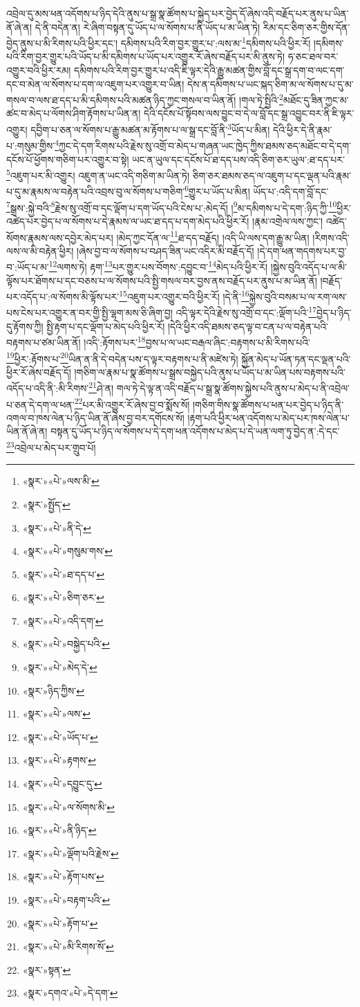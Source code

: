 འབྲེལ་དུ་མས་ཕན་འདོགས་པ་ཉིད་དེའི་ནུས་པ་སྒྲ་སྣ་ཚོགས་པ་སྐྱེད་པར་བྱེད་དོ་ཞེས་འདི་བརྗོད་པར་ནུས་པ་ཡིན་ནོ་ཞེ་ན། དེ་ནི་བདེན་ན། རེ་ཞིག་བསྟན་དུ་ཡོད་པ་ལ་སོགས་པ་ནི་ཡོད་པ་མ་ཡིན་ཏེ། རིམ་དང་ཅིག་ཅར་གྱིས་དོན་བྱེད་ནུས་པ་མི་རིགས་པའི་ཕྱིར་དང་། དམིགས་པའི་རིག་བྱར་གྱུར་པ་:ལས་མ་\footnote{«སྣར་»«པེ་»ལས་མི་}དམིགས་པའི་ཕྱིར་རོ། །དམིགས་པའི་རིག་བྱར་གྱུར་པའི་ཡོད་པ་མི་དམིགས་པ་ཡོད་པར་འགྱུར་རོ་ཞེས་བརྗོད་པར་མི་ནུས་ཏེ། ཧ་ཅང་ཐལ་བར་འགྱུར་བའི་ཕྱིར་རམ། དམིགས་པའི་རིག་བྱར་གྱུར་པ་འདི་ཇི་ལྟར་དེའི་རྒྱུ་མཚན་གྱིས་བློ་དང་སྒྲ་དག་བ་ལང་དག་དང་བ་མེན་ལ་སོགས་པ་དག་ལ་འཇུག་པར་འགྱུར་བ་ཡིན། དེས་ན་དམིགས་པ་ཡང་སྐད་ཅིག་མ་ལ་སོགས་པ་དུ་མ་གསལ་བ་ལས་ཐ་དད་པ་མི་དམིགས་པའི་མཚན་ཉིད་ཀྱང་གསལ་བ་ཡིན་ནོ། །གལ་ཏེ་སྤྱིའི་\footnote{«སྣར་»སྤྱོད་}མཐོང་དུ་ཟིན་ཀྱང་མ་ཚང་བ་མེད་པ་ལོགས་ཤིག་རྟོགས་པ་ཡིན་ན། དེའི་དངོས་པོ་སྟོབས་ལས་བྱུང་བ་དེ་ལ་བློ་དང་སྒྲ་འབྱུང་བར་ནི་ཇི་ལྟར་འགྱུར། དབྱིག་པ་ཅན་ལ་སོགས་པ་རྒྱུ་མཚན་མ་རྟོགས་པ་ལ་སྒྲ་དང་བློ་ནི་\footnote{«སྣར་»«པེ་»ནི་དེ་}ཡོད་པ་མིན། དེའི་ཕྱིར་དེ་ནི་རྣམ་པ་:གསུམ་གྱིས་\footnote{«སྣར་»«པེ་»གསུམ་གས་}ཀྱང་དེ་དག་རིགས་པའི་རྗེས་སུ་འགྲོ་བ་མེད་པ་གཞན་ཡང་ཁྱེད་ཀྱིས་ཐམས་ཅད་མཐོང་བ་དེ་དག་དངོས་པོ་ཕྱོགས་གཅིག་པར་འགྱུར་བ་སྟེ། ཡང་ན་ཡུལ་དང་དངོས་པོ་ཐ་དད་པས་འདི་ཅིག་ཅར་ཡུལ་:ཐ་དད་པར་\footnote{«སྣར་»«པེ་»ཐ་དད་པ་}འཇུག་པར་མི་འགྱུར། འཇུག་ན་ཡང་འདི་གཅིག་མ་ཡིན་ཏེ། ཅིག་ཅར་ཐམས་ཅད་ལ་འཇུག་པ་དང་ལྡན་པའི་རྣམ་པ་དུ་མ་རྣམས་ལ་བརྟེན་པའི་འབྲས་བུ་ལ་སོགས་པ་གཅིག་\footnote{«སྣར་»«པེ་»ཅིག་ཅར་}གྱུར་པ་ཡོད་པ་མིན། ཡོད་པ་:འདི་དག་བློ་དང་\footnote{«སྣར་»«པེ་»འདི་དག་}སྒྲས་:སྐྱེ་བའི་\footnote{«སྣར་»«པེ་»བསྐྱེད་པའི་}རྗེས་སུ་འགྲོ་བ་དང་ལྡོག་པ་དག་ཡོད་པའི་ངེས་པ་:མེད་དོ། །\footnote{«སྣར་»«པེ་»མེད་དེ་}མ་དམིགས་པ་དེ་དག་:ཉིད་ཀྱི་\footnote{«སྣར་»ཉིད་ཀྱིས་}ཕྱིར་འཚེད་པར་བྱེད་པ་ལ་སོགས་པ་དེ་རྣམས་ལ་ཡང་ཐ་དད་པ་དག་མེད་པའི་ཕྱིར་རོ། །རྣམ་འགྲེལ་ལས་ཀྱང་། འཚེད་སོགས་རྣམས་ལས་དབྱེར་མེད་པར། །མེད་ཀྱང་དོན་ལ་\footnote{«སྣར་»«པེ་»ལས་}ཐ་དད་བརྗོད། །འདི་ཡི་ལས་དག་རྒྱུ་མ་ཡིན། །རིགས་འདི་ལས་ལ་མི་བརྟེན་ཕྱིར། །ཞེས་བྱ་བ་ལ་སོགས་པ་བཤད་ཟིན་ཡང་འདིར་མི་བརྗོད་དོ། །དེ་དག་ཕན་གདགས་པར་བྱ་བ་:ཡོད་པ་མ་\footnote{«སྣར་»«པེ་»ཡོད་པ་}ལགས་ཏེ། རྟག་\footnote{«སྣར་»«པེ་»རྟགས་}པར་གྱུར་པས་བོགས་:དབྱུང་བ་\footnote{«སྣར་»«པེ་»དབྱུང་དུ་}མེད་པའི་ཕྱིར་རོ། །སྐྱེས་བུའི་འདོད་པ་ལ་མི་ལྟོས་པར་ཐོགས་པ་དང་བཅས་པ་ལ་སོགས་པའི་སྤྱི་གསལ་བར་བྱས་ནས་བརྗོད་པར་ནུས་པ་མ་ཡིན་ནོ། །བརྗོད་པར་འདོད་པ་:ལ་སོགས་མི་ལྟོས་པར་\footnote{«སྣར་»«པེ་»ལ་སོགས་མི་}འཇུག་པར་འགྱུར་བའི་ཕྱིར་རོ། །དེ་ནི་\footnote{«སྣར་»«པེ་»ནི་ཉིད་}སྐྱེས་བུའི་བསམ་པ་ལ་རག་ལས་པས་ངེས་པར་འགྱུར་ན་བར་གྱི་སྤྱི་ལྷག་མས་ཅི་ཞིག་བྱ། འདི་ལྟར་དེའི་རྗེས་སུ་འགྲོ་བ་དང་:ལྡོག་པའི་\footnote{«སྣར་»«པེ་»ལྡོག་པའི་རྗེས་}བྱེད་པ་ཉིད་དུ་རྟོགས་ཀྱི། སྤྱི་རྟག་པ་དང་ལྡོག་པ་མེད་པའི་ཕྱིར་རོ། །དེའི་ཕྱིར་འདི་ཐམས་ཅད་ལྟ་བ་ངན་པ་ལ་བརྟེན་པའི་བརྟགས་པ་ཙམ་ཡིན་ནོ། །འདི་:རྟོགས་པར་\footnote{«སྣར་»«པེ་»རྟོག་པས་}བྱས་པ་ལ་ཡང་བརྒལ་ཞིང་:བརྟགས་པ་མི་རིགས་པའི་\footnote{«སྣར་»«པེ་»བརྟག་པའི་}ཕྱིར་:རྟོགས་པ་\footnote{«སྣར་»«པེ་»རྟོག་པ་}ཡིན་ན་ནི་དེ་བདེན་པས་ད་ལྟར་བརྟགས་པ་ནི་མཛེས་ཏེ། སྐྱོན་མེད་པ་ཡོན་ཏན་དང་ལྡན་པའི་ཕྱིར་རོ་ཞེས་བརྗོད་དོ། །གཅིག་ལ་རྣམ་པ་སྣ་ཚོགས་པ་སྒྲས་བསྐྱེད་པའི་ནུས་པ་ཡོད་པ་མ་ཡིན་པས་བརྟགས་པའི་འདོད་པ་འདི་ནི་:མི་རིགས་\footnote{«སྣར་»«པེ་»མི་རིགས་སོ་}ཤེ་ན། གལ་ཏེ་དེ་ལྟ་ན་འདི་བརྗོད་པ་སྒྲ་སྣ་ཚོགས་སྐྱེས་པའི་ནུས་པ་མེད་པ་ནི་འབྲེལ་པ་ཅན་དེ་དག་ལ་ཕན་\footnote{«སྣར་»སྟན་}པར་མི་འགྱུར་རོ་ཞེས་བྱ་བ་སྨོས་སོ། །གཅིག་གིས་སྣ་ཚོགས་པ་ཕན་པར་བྱེད་པ་ཉིད་ནི་འགལ་བ་ཁས་ལེན་པ་ཉིད་ཡིན་ནོ་ཞེས་བྱ་བར་དགོངས་སོ། །རྟག་པའི་ཕྱིར་ཕན་འདོགས་པ་མེད་པར་ཁས་ལེན་པ་ཡིན་ནོ་ཞེ་ན། བསྟན་དུ་ཡོད་པ་ཉིད་ལ་སོགས་པ་དེ་དག་ཕན་འདོགས་པ་མེད་པ་དེ་ཡན་ལག་ཏུ་བྱེད་ན་:དེ་དང་\footnote{«སྣར་»དགའ་«པེ་»དེ་དག་}འབྲེལ་པ་མེད་པར་གྲུབ་པོ། 